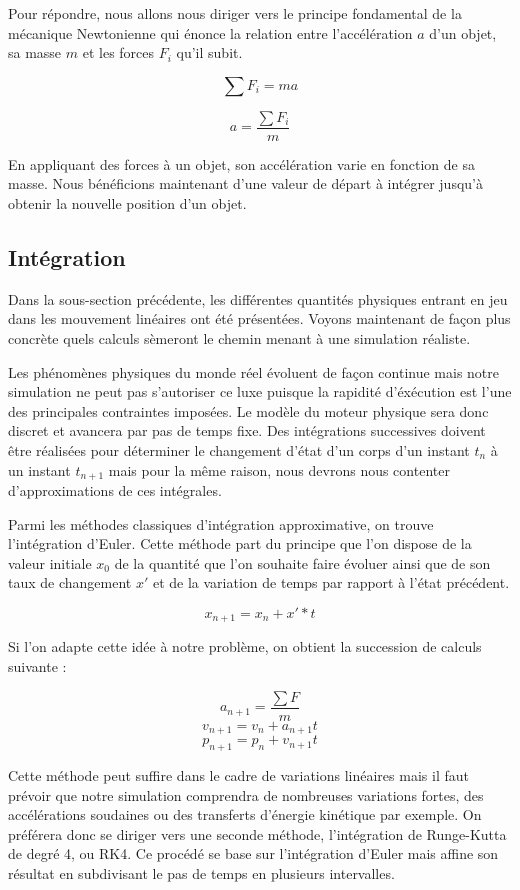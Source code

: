 \documentclass[twocolumn]{article}
\begin{document}
Pour répondre, nous allons nous diriger vers le principe fondamental de la mécanique Newtonienne qui énonce la relation entre l'accélération $a$ d'un objet, sa masse $m$ et les forces $F_i$ qu'il subit.

\[\sum F_i = m a\]

\[a = \frac{\sum F_i}{m}\]

En appliquant des forces à un objet, son accélération varie en fonction de sa masse. Nous bénéficions maintenant d'une valeur de départ à intégrer jusqu'à obtenir la nouvelle position d'un objet.

\subsection{Intégration}

Dans la sous-section précédente, les différentes quantités physiques entrant en jeu dans les mouvement linéaires ont été présentées. Voyons maintenant de façon plus concrète quels calculs sèmeront le chemin menant à une simulation réaliste.

Les phénomènes physiques du monde réel évoluent de façon continue mais notre simulation ne peut pas s'autoriser ce luxe puisque la rapidité d'éxécution est l'une des principales contraintes imposées. Le modèle du moteur physique sera donc discret et avancera par pas de temps fixe. Des intégrations successives doivent être réalisées pour déterminer le changement d'état d'un corps d'un instant $t_n$ à un instant $t_{n+1}$ mais pour la même raison, nous devrons nous contenter d'approximations de ces intégrales.

Parmi les méthodes classiques d'intégration approximative, on trouve l'intégration d'Euler. Cette méthode part du principe que l'on dispose de la valeur initiale $x_0$ de la quantité que l'on souhaite faire évoluer ainsi que de son taux de changement $x'$ et de la variation de temps par rapport à l'état précédent.

\[x_{n+1} = x_{n} + x' * t\]

Si l'on adapte cette idée à notre problème, on obtient la succession de calculs suivante :

\[a_{n+1} = \frac{\sum F}{m}\]
\[v_{n+1} = v_n + a_{n+1} t\]
\[p_{n+1} = p_n + v_{n+1} t\]

Cette méthode peut suffire dans le cadre de variations linéaires mais il faut prévoir que notre simulation comprendra de nombreuses variations fortes, des accélérations soudaines ou des transferts d'énergie kinétique par exemple. On préférera donc se diriger vers une seconde méthode, l'intégration de Runge-Kutta de degré 4, ou RK4. Ce procédé se base sur l'intégration d'Euler mais affine son résultat en subdivisant le pas de temps en plusieurs intervalles.
\end{document}
